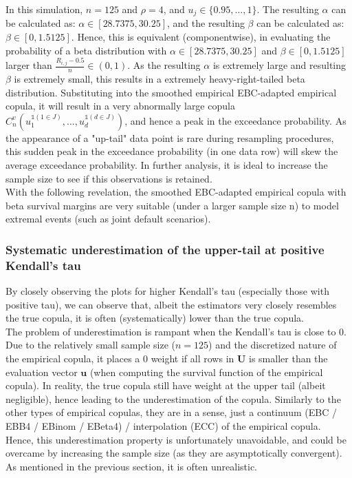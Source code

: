 \documentclass[12pt]{report}
\newcommand{\1}{\mathbf{1}}
\begin{document}
\begin{flushleft}
In this simulation, $n = 125$ and $\rho = 4$, and $u_{j} \in \{0.95, \dots, 1\}$. The resulting $\alpha$ can be calculated as: $\alpha \in [28.7375, 30.25]$, and the resulting $\beta$ can be calculated as: $\beta \in [0, 1.5125]$. Hence, this is equivalent (componentwise), in evaluating the probability of a beta distribution with $\alpha \in [28.7375, 30.25]$ and $\beta \in [0, 1.5125]$ larger than $\frac{R_{i,j} - 0.5}{n} \in (0,1)$. As the resulting $\alpha$ is extremely large and resulting $\beta$ is extremely small, this results in a extremely heavy-right-tailed beta distribution. Substituting into the smoothed empirical EBC-adapted empirical copula, it will result in a very abnormally large copula $C^{v}_{n} \left( u_{1}^{\mathds{1}(1\in J)}, \dots, u_{d}^{\mathds{1}(d\in J)} \right)$, and hence a peak in the exceedance probability. As the appearance of a "up-tail" data point is rare during resampling procedures, this sudden peak in the exceedance probability (in one data row) will skew the average exceedance probability. In further analysis, it is ideal to increase the sample size to see if this observations is retained.\\
\vspace{0.5cm}
With the following revelation, the smoothed EBC-adapted empirical copula with beta survival margins are very suitable (under a larger sample size n) to model extremal events (such as joint default scenarios).

\subsubsection{Systematic underestimation of the upper-tail at positive Kendall's tau}
By closely observing the plots for higher Kendall's tau (especially those with positive tau), we can observe that, albeit the estimators very closely resembles the true copula, it is often (systematically) lower than the true copula.\\
\vspace{0.5cm}
The problem of underestimation is rampant when the Kendall's tau is close to 0. Due to the relatively small sample size ($n = 125$) and the discretized nature of the empirical copula, it places a 0 weight if all rows in $\textbf{U}$ is smaller than the evaluation vector $\textbf{u}$ (when computing the survival function of the empirical copula). In reality, the true copula still have weight at the upper tail (albeit negligible), hence leading to the underestimation of the copula. Similarly to the other types of empirical copulas, they are in a sense, just a continuum (EBC / EBB4 / EBinom / EBeta4) / interpolation (ECC) of the empirical copula. Hence, this underestimation property is unfortunately unavoidable, and could be overcame by increasing the sample size (as they are asymptotically convergent). As mentioned in the previous section, it is often unrealistic. 


\end{flushleft}
\end{document}
